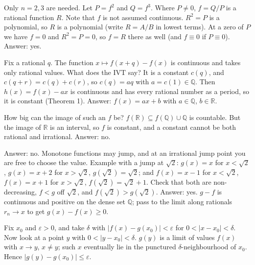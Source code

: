 \documentclass[11pt,a4paper]{article}
\begin{document}

 Only $n=2,3$ are needed. Let $P=f^2$ and $Q=f^3$. Where $P\ne0$, $f=Q/P$ is a rational function $R$. Note that $f$ is not assumed continuous.
 $R^2=P$ is a polynomial, so $R$ is a polynomial (write $R=A/B$ in lowest terms).
 At a zero of $P$ we have $f=0$ and $R^2=P=0$, so $f=R$ there as well (and $f\equiv0$ if $P\equiv0$). Answer: yes.

 Fix a rational $q$. The function $x\mapsto f(x+q)-f(x)$ is continuous and takes only rational values. What does the IVT say?
 It is a constant $c(q)$, and $c(q+r)=c(q)+c(r)$, so $c(q)=aq$ with $a=c(1)\in\mathbb Q$.
 Then $h(x)=f(x)-ax$ is continuous and has every rational number as a period, so it is constant (Theorem 1). Answer: $f(x)=ax+b$ with $a\in\mathbb Q$, $b\in\mathbb R$.

 How big can the image of such an $f$ be?
 $f(\mathbb R)\subseteq f(\mathbb Q)\cup\mathbb Q$ is countable. But the image of $\mathbb R$ is an interval, so $f$ is constant, and a constant cannot be both rational and irrational. Answer: no.

 Answer: no. Monotone functions may jump, and at an irrational jump point you are free to choose the value.
 Example with a jump at $\sqrt2$: $g(x)=x$ for $x<\sqrt2$, $g(x)=x+2$ for $x>\sqrt2$, $g(\sqrt2)=\sqrt2$; and $f(x)=x-1$ for $x<\sqrt2$, $f(x)=x+1$ for $x>\sqrt2$, $f(\sqrt2)=\sqrt2+1$. Check that both are non-decreasing, $f<g$ off $\sqrt2$, and $f(\sqrt2)>g(\sqrt2)$.
 Answer: yes. $g-f$ is continuous and positive on the dense set $\mathbb Q$; pass to the limit along rationals $r_n\to x$ to get $g(x)-f(x)\ge0$.

 Fix $x_0$ and $\varepsilon>0$, and take $\delta$ with $|f(x)-g(x_0)|<\varepsilon$ for $0<|x-x_0|<\delta$. Now look at a point $y$ with $0<|y-x_0|<\delta$.
 $g(y)$ is a limit of values $f(x)$ with $x\to y$, $x\ne y$; such $x$ eventually lie in the punctured $\delta$-neighbourhood of $x_0$. Hence $|g(y)-g(x_0)|\le\varepsilon$.
\end{document}
